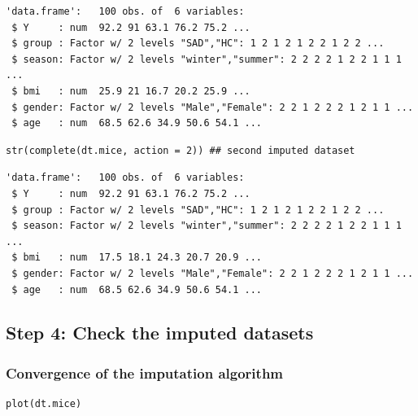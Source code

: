 \documentclass[12pt]{article}
\begin{document}
\begin{verbatim}
'data.frame':	100 obs. of  6 variables:
 $ Y     : num  92.2 91 63.1 76.2 75.2 ...
 $ group : Factor w/ 2 levels "SAD","HC": 1 2 1 2 1 2 2 1 2 2 ...
 $ season: Factor w/ 2 levels "winter","summer": 2 2 2 2 1 2 2 1 1 1 ...
 $ bmi   : num  25.9 21 16.7 20.2 25.9 ...
 $ gender: Factor w/ 2 levels "Male","Female": 2 2 1 2 2 2 1 2 1 1 ...
 $ age   : num  68.5 62.6 34.9 50.6 54.1 ...
\end{verbatim}

\lstset{language=r,label= ,caption= ,captionpos=b,numbers=none}
\begin{lstlisting}
str(complete(dt.mice, action = 2)) ## second imputed dataset
\end{lstlisting}

\begin{verbatim}
'data.frame':	100 obs. of  6 variables:
 $ Y     : num  92.2 91 63.1 76.2 75.2 ...
 $ group : Factor w/ 2 levels "SAD","HC": 1 2 1 2 1 2 2 1 2 2 ...
 $ season: Factor w/ 2 levels "winter","summer": 2 2 2 2 1 2 2 1 1 1 ...
 $ bmi   : num  17.5 18.1 24.3 20.7 20.9 ...
 $ gender: Factor w/ 2 levels "Male","Female": 2 2 1 2 2 2 1 2 1 1 ...
 $ age   : num  68.5 62.6 34.9 50.6 54.1 ...
\end{verbatim}

\clearpage

\subsection{Step 4: Check the imputed datasets}
\label{sec:orga55e89b}
\subsubsection{Convergence of the imputation algorithm}
\label{sec:orgbae9b3f}

\lstset{language=r,label= ,caption= ,captionpos=b,numbers=none}
\begin{lstlisting}
plot(dt.mice)
\end{lstlisting}
\end{document}
